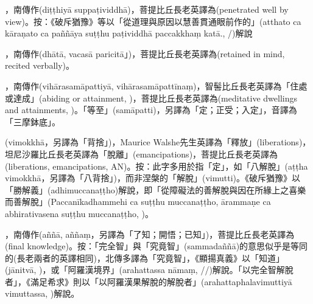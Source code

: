 \startitemgroup[noteitems]
\item{}，南傳作(diṭṭhiyā suppaṭividdhā)，菩提比丘長老英譯為(penetrated well by view)。按：《破斥猶豫》等以「從道理與原因以慧善貫通眼前作的」(atthato ca kāraṇato ca paññāya suṭṭhu paṭividdhā paccakkhaṃ katā., /)解說
\stopitemgroup

\startitemgroup[noteitems]
\item{}，南傳作(dhātā, vacasā paricitā」)，菩提比丘長老英譯為(retained in mind, recited verbally)。
\stopitemgroup

\startitemgroup[noteitems]
\item{}，南傳作(vihārasamāpattiyā, vihārasamāpattīnaṃ)，智髻比丘長老英譯為「住處或達成」(abiding or attainment, )，菩提比丘長老英譯為(meditative dwellings and attainments, )。「等至」(samāpatti)，另譯為「定；正受；入定」，音譯為「三摩鉢底」。
\stopitemgroup

\startitemgroup[noteitems]
\item{}(vimokkhā，另譯為「背捨」)，Maurice Walshe先生英譯為「釋放」(liberations)，坦尼沙羅比丘長老英譯為「脫離」(emancipations)，菩提比丘長老英譯為(liberations, emancipations, AN)。按：此字多用於指「定」，如「八解脫」(aṭṭha vimokkhā，另譯為「八背捨」)，而非涅槃的「解脫」(vimutti)。《破斥猶豫》以「勝解義」(adhimuccanaṭṭho)解說，即「從障礙法的善解脫與因在所緣上之喜樂而善解脫」(Paccanīkadhammehi ca suṭṭhu muccanaṭṭho, ārammaṇe ca abhirativasena suṭṭhu muccanaṭṭho, )。
\stopitemgroup

\startitemgroup[noteitems]
\item{}，南傳作(aññā, aññaṃ，另譯為「了知；開悟；已知」)，菩提比丘長老英譯為(final knowledge)。按：「完全智」與「究竟智」(sammadaññā)的意思似乎是等同的(長老兩者的英譯相同)，北傳多譯為「究竟智」，《顯揚真義》以「知道」(jānitvā, )，或「阿羅漢境界」(arahattassa nāmaṃ, //)解說。「以完全智解脫者」，《滿足希求》則以「以阿羅漢果解脫的解脫者」(arahattaphalavimuttiyā vimuttassa, )解說。
\stopitemgroup

